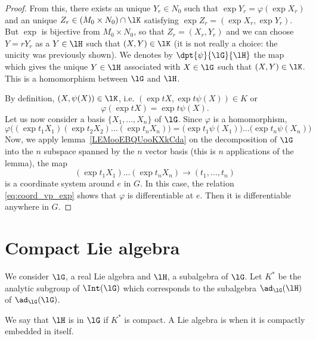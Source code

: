 \begin{proof}
	From this, there exists an unique $Y_r\in N_0$ such that $\exp Y_r=\varphi(\exp X_r)$ and an unique $Z_r\in(M_0\times N_0)\cap\lK$ satisfying  $\exp Z_r=(\exp X_r,\exp Y_r)$. But $\exp$ is bijective from $M_0\times N_0$, so that $Z_r=(X_r,Y_r)$ and we can choose $Y=rY_r$ as a $Y\in\lH$ such that $(X,Y)\in\lK$ (it is not really a choice: the unicity was previously shown). We denotes by $\dpt{\psi}{\lG}{\lH}$ the map which gives the unique $Y\in\lH$ associated with $X\in\lG$ such that $(X,Y)\in\lK$. This is a homomorphism between $\lG$ and $\lH$.

	By definition, $(X,\psi(X))\in\lK$, i.e. $(\exp tX,\exp t\psi(X))\in K$ or
	\begin{equation}
		\varphi(\exp tX)=\exp t\psi(X).
	\end{equation}
	Let us now consider a basis $\{X_1,\ldots,X_n\}$ of $\lG$. Since $\varphi$ is a homomorphism,
	\begin{equation}\label{eq:coord_vp_exp}
		\varphi\big((\exp t_1X_1)(\exp t_2X_2)\ldots(\exp t_nX_n)\big)
		=\big(\exp t_1\psi(X_1)\big)\ldots\big( \exp t_n\psi(X_n) \big)
	\end{equation}
	Now, we apply lemma~\ref{LEMooEBQUooKXkCda} on the decomposition of $\lG$ into the $n$ subspace spanned by the $n$ vector basis (this is $n$ applications of the lemma), the map
	\[
		(\exp t_1X_1)\ldots(\exp t_nX_n)\to (t_1,\ldots,t_n)
	\]
	is a coordinate system around $e$ in $G$. In this case, the relation \eqref{eq:coord_vp_exp} shows that $\varphi$ is differentiable at $e$. Then it is differentiable anywhere in $G$.
\end{proof}
\section{Compact Lie algebra}
\label{pg:compact_Lie}



We consider $\lG$, a real Lie algebra and $\lH$, a subalgebra of $\lG$. Let $K^*$ be the analytic subgroup of $\Int(\lG)$ which corresponds to the subalgebra $\ad_{\lG}(\lH)$ of $\ad_{\lG}(\lG)$.

\begin{definition}      \label{DEFooROMGooTLicyL}
	We say that $\lH$ is  in $\lG$ if $K^*$ is compact. A Lie algebra is  when it is compactly embedded in itself.
\end{definition}

